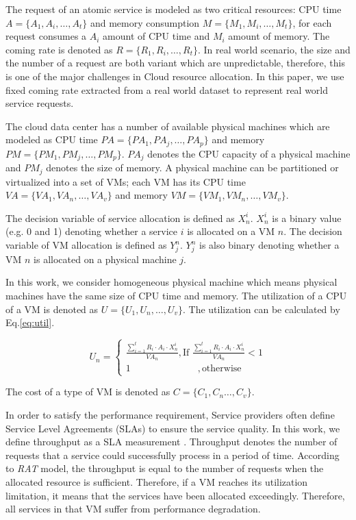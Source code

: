 The request of an atomic service is modeled as two critical resources: 
CPU time $A = \{A_1, A_i, \dots, A_t \}$ and 
memory consumption $M = \{M_1, M_i, \dots, M_t \}$, 
for each request consumes a $A_i$ amount of CPU time 
and $M_i$ amount of memory. 
The coming rate is denoted as $R = \{R_1, R_i, \dots, R_t \}$. 
In real world scenario, the size and the number of a request are both variant 
which are unpredictable, therefore, this is one of the major challenges in Cloud resource allocation. 
In this paper, we use fixed coming rate extracted from a real world dataset to represent real world service requests. 
 
The cloud data center has a number of available physical machines which are modeled as
CPU time $PA = \{PA_1, PA_j, \dots, PA_p\}$ and memory
$PM = \{PM_1, PM_j, \dots, PM_p\}$. $PA_j$ denotes the CPU capacity of a physical machine 
and $PM_j$ denotes the size of memory. A physical machine can be partitioned or
 virtualized into a set of VMs; 
 each VM has its 
 CPU time $VA = \{VA_1, VA_n, \dots, VA_v\}$ and 
 memory $VM = \{VM_1, VM_n, \dots, VM_v\}$. 


The decision variable of service allocation is defined as $X^i_n$. $X^i_n$
is a binary value (e.g. 0 and 1) denoting whether a
service $i$ is allocated on a VM $n$.
The decision variable of VM allocation is defined as $Y^n_j$. $Y^n_j$
is also binary denoting whether a
VM $n$ is allocated on a physical machine $j$.


 In this work, we consider homogeneous physical machine which means physical machines have the same size of CPU time and memory. 
 The utilization of a CPU of a VM is denoted as $U = \{U_1, U_n, \dots, U_v\}$. 
 The utilization can be calculated by Eq.\ref{eq:util}.

\begin{equation}
\label{eq:util}
  U_n =
  \begin{cases} 
    \frac{\sum_{i = 1}^t R_i \cdot A_i \cdot X^i_n}{VA_n}, \text{If }  \frac{\sum_{i = 1}^t R_i \cdot A_i \cdot X^i_n}{VA_n} < 1 \\
    1   \quad\quad\quad\quad\quad\quad\quad ,\text{otherwise}
  \end{cases}
\end{equation}

The cost of a type of VM is denoted as $C = \{C_1, C_n \dots, C_v\}$. 



In order to satisfy the performance requirement, Service providers often define Service Level Agreements (SLAs) to ensure the service quality. In this work, we define throughput as a SLA measurement \cite{SLA_metric}. 
Throughput denotes the number of requests that a service could successfully process in a period of time. According to \textit{RAT} model, the throughput is equal to the number of requests when the allocated resource is sufficient. 
Therefore, if a VM reaches its utilization limitation, it means that the services have been allocated exceedingly.
Therefore, all services in that VM suffer from 
performance degradation.


